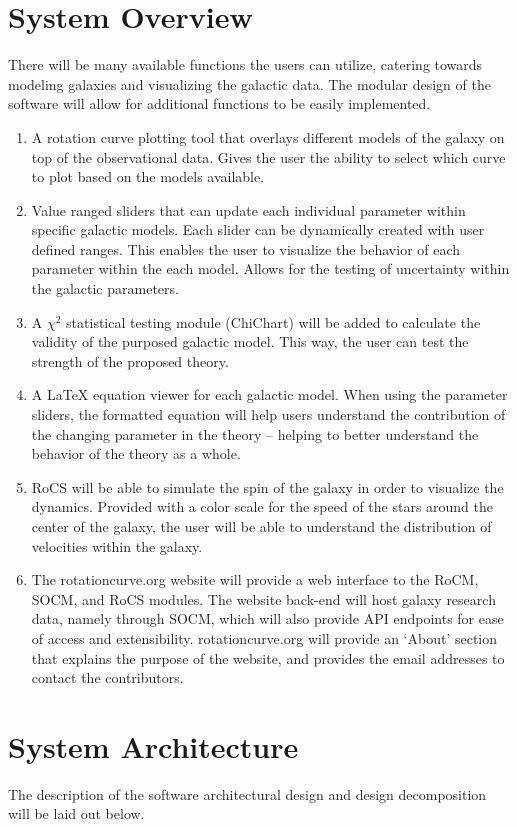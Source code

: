\documentclass[titlepage]{article}
\begin{document}
\section{System Overview}
There will be many available functions the users can utilize, catering towards modeling galaxies and visualizing the galactic data. The modular design of the software will allow for additional functions to be easily implemented.
\begin{enumerate}
	\item A rotation curve plotting tool that overlays different models of the galaxy on top of the observational data. Gives the user the ability to select which curve to plot based on the models available. 
	\item Value ranged sliders that can update each individual parameter within specific galactic models. Each slider can be dynamically created with user defined ranges. This enables the user to visualize the behavior of each parameter within the each model. Allows for the testing of uncertainty within the galactic parameters.
	\item A $\chi^2$ statistical testing module (ChiChart) will be added to calculate the validity of the purposed galactic model. This way, the user can test the strength of the proposed theory.
	\item A \LaTeX \- equation viewer for each galactic model. When using the parameter sliders, the formatted equation will help users understand the contribution of the changing parameter in the theory -- helping to better understand the behavior of the theory as a whole.
	\item RoCS will be able to simulate the spin of the galaxy in order to visualize the dynamics. Provided with a color scale for the speed of the stars around the center of the galaxy, the user will be able to understand the distribution of velocities within the galaxy.
	\item The rotationcurve.org website will provide a web interface to the RoCM, SOCM, and RoCS modules. The website back-end will host galaxy research data, namely through SOCM, which will also provide API endpoints for ease of access and extensibility. rotationcurve.org will provide an `About' section that explains the purpose of the website, and provides the email addresses to contact the contributors.
\end{enumerate}

\section{System Architecture}
The description of the software architectural design and design decomposition will be laid out below.
	
\end{document}
